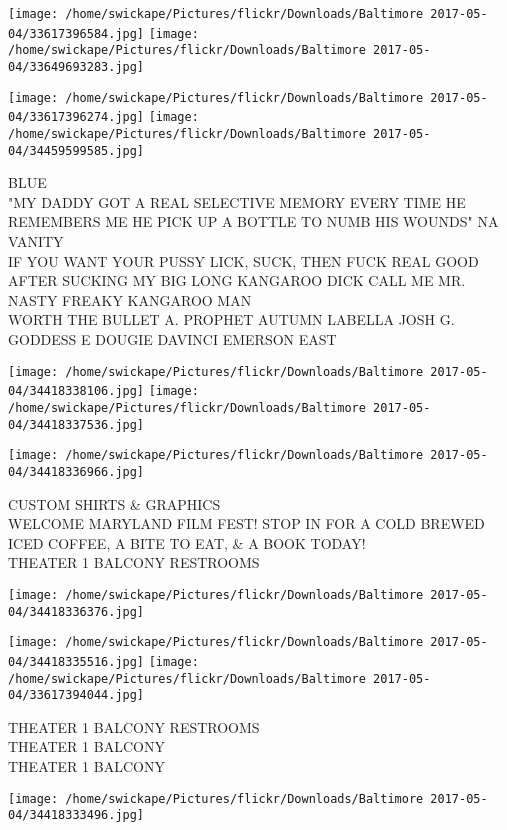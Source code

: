 \documentclass[10pt,letterpaper]{article}
\begin{document}
\texttt{[image: /home/swickape/Pictures/flickr/Downloads/Baltimore 2017-05-04/33617396584.jpg]}
\texttt{[image: /home/swickape/Pictures/flickr/Downloads/Baltimore 2017-05-04/33649693283.jpg]}

\texttt{[image: /home/swickape/Pictures/flickr/Downloads/Baltimore 2017-05-04/33617396274.jpg]}
\texttt{[image: /home/swickape/Pictures/flickr/Downloads/Baltimore 2017-05-04/34459599585.jpg]}

BLUE\\
"MY DADDY GOT A REAL SELECTIVE MEMORY EVERY TIME HE REMEMBERS ME HE PICK UP A BOTTLE TO NUMB HIS WOUNDS" NA VANITY\\
IF YOU WANT YOUR PUSSY LICK, SUCK, THEN FUCK REAL GOOD AFTER SUCKING MY BIG LONG KANGAROO DICK CALL ME MR. NASTY FREAKY KANGAROO MAN\\
WORTH THE BULLET A. PROPHET AUTUMN LABELLA JOSH G. GODDESS E DOUGIE DAVINCI EMERSON EAST
\pagebreak

\texttt{[image: /home/swickape/Pictures/flickr/Downloads/Baltimore 2017-05-04/34418338106.jpg]}
\texttt{[image: /home/swickape/Pictures/flickr/Downloads/Baltimore 2017-05-04/34418337536.jpg]}

\vspace{0.25in}
\texttt{[image: /home/swickape/Pictures/flickr/Downloads/Baltimore 2017-05-04/34418336966.jpg]}

CUSTOM SHIRTS \& GRAPHICS\\
WELCOME MARYLAND FILM FEST!  STOP IN FOR A COLD BREWED ICED COFFEE, A BITE TO EAT, \& A BOOK TODAY!\\
THEATER 1 BALCONY RESTROOMS
\pagebreak

\texttt{[image: /home/swickape/Pictures/flickr/Downloads/Baltimore 2017-05-04/34418336376.jpg]}

\vspace{0.25in}
\texttt{[image: /home/swickape/Pictures/flickr/Downloads/Baltimore 2017-05-04/34418335516.jpg]}
\texttt{[image: /home/swickape/Pictures/flickr/Downloads/Baltimore 2017-05-04/33617394044.jpg]}

THEATER 1 BALCONY RESTROOMS\\
THEATER 1 BALCONY\\
THEATER 1 BALCONY
\pagebreak

\texttt{[image: /home/swickape/Pictures/flickr/Downloads/Baltimore 2017-05-04/34418333496.jpg]}
\end{document}
